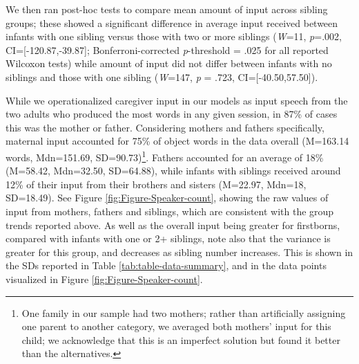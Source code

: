 \documentclass[
  man,floatsintext]{apa6}
\begin{document}
We then ran post-hoc tests to compare mean amount of input across sibling groups; these showed a significant difference in average input received between infants with one sibling versus those with two or more siblings (\emph{W}=11, \emph{p}=.002, CI={[}-120.87,-39.87{]}; Bonferroni-corrected \emph{p}-threshold = .025 for all reported Wilcoxon tests) while amount of input did not differ between infants with no siblings and those with one sibling (\emph{W}=147, \emph{p} = .723, CI={[}-40.50,57.50{]}).

While we operationalized caregiver input in our models as input speech from the two adults who produced the most words in any given session, in 87\% of cases this was the mother or father. Considering mothers and fathers specifically, maternal input accounted for 75\% of object words in the data overall (M=163.14 words, Mdn=151.69, SD=90.73)\footnote{One family in our sample had two mothers; rather than artificially assigning one parent to another category, we averaged both mothers' input for this child; we acknowledge that this is an imperfect solution but found it better than the alternatives.}. Fathers accounted for an average of 18\% (M=58.42, Mdn=32.50, SD=64.88), while infants with siblings received around 12\% of their input from their brothers and sisters (M=22.97, Mdn=18, SD=18.49). See Figure \ref{fig:Figure-Speaker-count}, showing the raw values of input from mothers, fathers and siblings, which are consistent with the group trends reported above. As well as the overall input being greater for firstborns, compared with infants with one or 2+ siblings, note also that the variance is greater for this group, and decreases as sibling number increases. This is shown in the SDs reported in Table \ref{tab:table-data-summary}, and in the data points visualized in Figure \ref{fig:Figure-Speaker-count}.
\end{document}
